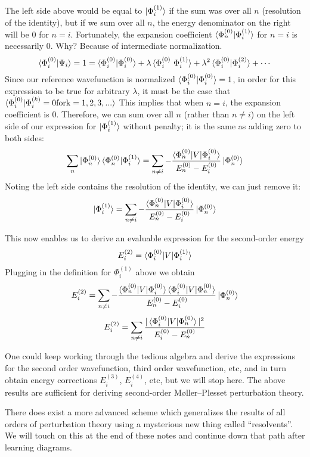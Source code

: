\documentclass{article}
\newcommand{\lam}{\lambda}
\newcommand{\Ezero}{E^{(0)}}
\newcommand{\Phizero}{\Phi^{(0)}}
\newcommand{\Phione}{\Phi^{(1)}}
\begin{document}
The left side above would be equal to $\ket{\Phione_i}$ if the sum was over all $n$ (resolution of the identity), 
    but if we sum over all $n$, the energy denominator on the right will be 0 for $n = i$. 
Fortunately, the expansion coefficient $\braket{\Phizero_n | \Phione_i } $ for $n = i$ is necessarily 0.
Why? Because of intermediate normalization.
\[\braket{\Phizero_i | \Psi_i} = 1 = \braket{\Phizero_i | \Phizero_i} + \lam \braket{\Phizero_i \ \Phione_i} + \lam^2 \braket{\Phizero_i|\Phi_i^{(2)}} + \cdots \]
Since our reference wavefunction is normalized $\braket{\Phizero_i | \Phizero_i} = 1$, in order for this expression to be true for arbitrary $\lam$,
it must be the case that $\braket{\Phizero_i | \Phi_i^{(k)} = 0 \mathrm{for k} = 1,2,3,...}   $
This implies that when $n = i$, the expansion coefficient is 0.
Therefore, we can sum over all $n$ (rather than $n \neq i$) on the left side of our expression for $\ket{\Phione_i}$ without penalty; it is the same as adding zero to both sides:
\[ \sum_{n} \ket{ \Phizero_n} \braket{\Phizero_n | \Phione_i } = \sum_{n \neq i} -\frac{ \braket{ \Phizero_n | V | \Phizero_i} }{ \Ezero_n - \Ezero_i} \ket{\Phizero_n} \]
Noting the left side contains the resolution of the identity, we can just remove it:
\[ \ket{\Phione_i} = \sum_{n \neq i} -\frac{ \braket{ \Phizero_n | V | \Phizero_i} }{ \Ezero_n - \Ezero_i} \ket{\Phizero_n} \]

This now enables us to derive an evaluable expression for the second-order energy 
\[ E_i^{(2)} = \braket{\Phi_i^{(0)} | V | \Phi_i^{(1)}} \]
Plugging in the definition for $\Phi_i^{(1)}$ above we obtain
\[ E_i^{(2)} = \sum_{n \neq i} -\frac{ \braket{ \Phizero_n | V | \Phizero_i} \braket{ \Phizero_i | V | \Phizero_n} }{ \Ezero_n - \Ezero_i} \ket{\Phizero_n} \]
\[ E_i^{(2)} = \sum_{n \neq i} \frac{ |\braket{ \Phizero_i | V | \Phizero_n} |^2  }{ \Ezero_i - \Ezero_n} \]

One could keep working through the tedious algebra and derive the expressions for the second order wavefunction, third order wavefunction, etc, and
in turn obtain energy corrections $E_i^{(3)}$, $E_i^{(4)}$, etc, but we will stop here.
The above results are sufficient for deriving second-order M{\o}ller--Plesset perturbation theory.

There does exist a more advanced scheme which generalizes the results of all orders of perturbation theory using a mysterious new thing called ``resolvents''.
We will touch on this at the end of these notes and continue down that path after learning diagrams. 
\end{document}
